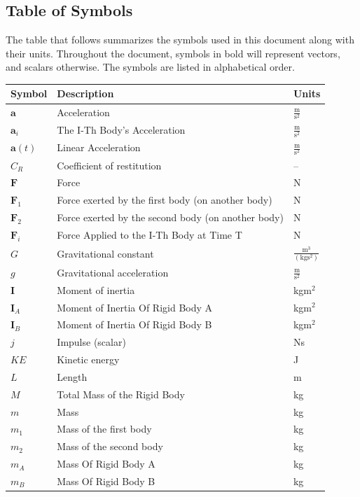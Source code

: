 \documentclass[12pt]{article}
\begin{document}
\subsection{Table of Symbols}
\label{Sec:ToS}
The table that follows summarizes the symbols used in this document along with their units. Throughout the document, symbols in bold will represent vectors, and scalars otherwise. The symbols are listed in alphabetical order.
\begin{longtabu}{l X[l] l}
\toprule
Symbol & Description & Units
\\
\midrule
\endhead
$\mathbf{a}$ & Acceleration & $\frac{\text{m}}{\text{s}^{2}}$
\\
${\mathbf{a}_{i}}$ & The I-Th Body's Acceleration & $\frac{\text{m}}{\text{s}^{2}}$
\\
$\mathbf{a}(t)$ & Linear Acceleration & $\frac{\text{m}}{\text{s}^{2}}$
\\
${C_{R}}$ & Coefficient of restitution & --
\\
$\mathbf{F}$ & Force & N
\\
${\mathbf{F}_{1}}$ & Force exerted by the first body (on another body) & N
\\
${\mathbf{F}_{2}}$ & Force exerted by the second body (on another body) & N
\\
${\mathbf{F}_{i}}$ & Force Applied to the I-Th Body at Time T & N
\\
$G$ & Gravitational constant & $\frac{\text{m}^{3}}{(\text{kg}\text{s}^{2})}$
\\
$g$ & Gravitational acceleration & $\frac{\text{m}}{\text{s}^{2}}$
\\
$\mathbf{I}$ & Moment of inertia & kg$\text{m}^{2}$
\\
${\mathbf{I}_{A}}$ & Moment of Inertia Of Rigid Body A & kg$\text{m}^{2}$
\\
${\mathbf{I}_{B}}$ & Moment of Inertia Of Rigid Body B & kg$\text{m}^{2}$
\\
$j$ & Impulse (scalar) & Ns
\\
$KE$ & Kinetic energy & J
\\
$L$ & Length & m
\\
$M$ & Total Mass of the Rigid Body & kg
\\
$m$ & Mass & kg
\\
${m_{1}}$ & Mass of the first body & kg
\\
${m_{2}}$ & Mass of the second body & kg
\\
${m_{A}}$ & Mass Of Rigid Body A & kg
\\
${m_{B}}$ & Mass Of Rigid Body B & kg

\end{longtabu}
\end{document}
